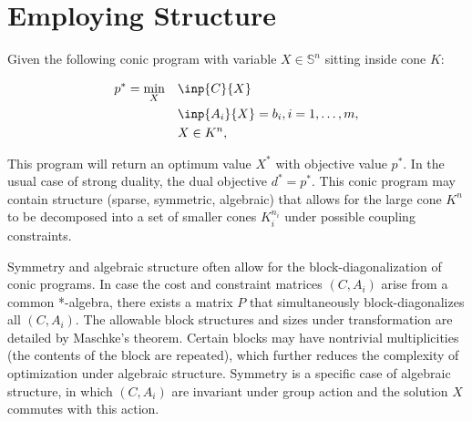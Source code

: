 \documentclass{article}
\newcommand{\psd}{\mathbb{S}}
\begin{document}
\section{Employing Structure}

Given the following conic program with variable $X \in \psd^n$ sitting inside cone $K$:

\begin{align}%
    p^* =\min_{X} \quad & \inp{C}{X} \nonumber \\
    & \inp{A_i}{X} = b_i, i = 1, \ldots, m,\label{Eq:SDPprimal}\\
     & X \in K^n,   \nonumber \\
\end{align}

This program will return an optimum value $X^*$ with objective value $p^*$.                                                       In the usual case of strong duality, the dual objective $d^* =  p^*$. This conic program may contain structure (sparse, symmetric, algebraic) that allows for the large cone $K^n$ to be decomposed into a set of smaller cones $K_i^{n_i}$ under possible coupling constraints.

Symmetry and algebraic structure often allow for the block-diagonalization of conic programs. In case the cost and constraint matrices $(C, A_i)$ arise from a common *-algebra, there exists a matrix $P$ that simultaneously block-diagonalizes all $(C, A_i)$. The allowable block structures and sizes under transformation are detailed by Maschke's theorem. Certain blocks may have nontrivial multiplicities (the contents of the block are repeated),  which further reduces the complexity of optimization under algebraic structure. Symmetry is a specific case of algebraic structure, in which $(C, A_i)$ are invariant under group action and the solution $X$ commutes with this action. 





\end{document}
